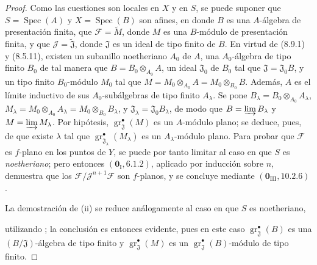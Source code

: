 \begin{proof}
Como las cuestiones son locales en $X$ y en $S$, se puede suponer que
$S=\operatorname{Spec}(A)$ y $X=\operatorname{Spec}(B)$ son afines,
en donde $B$ es una $A$-álgebra de presentación finita, que
$\mathcal F=\widetilde M$, donde $M$ es una
$B$-módulo de presentación finita, y que
$\mathcal J=\widetilde{\mathfrak J}$, donde $\mathfrak J$ es un ideal
de tipo finito de $B$. En virtud de (8.9.1) y (8.5.11),
existen un subanillo noetheriano $A_0$ de $A$, una
$A_0$-álgebra de tipo finito $B_0$ de tal manera que
$B=B_0\otimes_{A_0}A$, un ideal
$\mathfrak J_0$ de $B_0$ tal que
$\mathfrak J=\mathfrak J_0B$, y un tipo finito
$B_0$-módulo $M_0$ tal que
$M=M_0\otimes_{A_0}A=M_0\otimes_{B_0}B$. Además,
$A$ es el límite inductivo de sus
$A_0$-subálgebras de tipo finito $A_\lambda$. Se pone
$B_\lambda=B_0\otimes_{A_0}A_\lambda$,
$M_\lambda=M_0\otimes_{A_0}A_\lambda=M_0\otimes_{B_0}B_\lambda$, y
$\mathfrak J_\lambda=\mathfrak J_0B_\lambda$, de modo que
$B=\varinjlim B_\lambda$ y
$M=\varinjlim M_\lambda$. Por hipótesis,
$\operatorname{gr}_{\mathfrak J}^\bullet(M)$ es un
$A$-módulo plano; se deduce, pues, de  que
existe $\lambda$ tal que
$\operatorname{gr}_{\mathfrak J_\lambda}^\bullet(M_\lambda)$ es un
$A_\lambda$-módulo plano. Para probar que $\mathcal F$ es $f$-plano en
los puntos de $Y$, se puede por tanto limitar al caso en que
$S$ es \emph{noetheriano}; pero entonces $(\mathbf 0_{\mathrm I},6.1.2)$,
aplicado por inducción sobre $n$, demuestra que los
$\mathcal F/\mathcal J^{n+1}\mathcal F$ son $f$-planos, y se concluye mediante
$(\mathbf 0_{\mathrm{III}},10.2.6)$.


La demostración de (ii) se reduce análogamente al caso en que $S$ es noetheriano, 


utilizando ; la conclusión es entonces evidente, pues en este caso $\operatorname{gr}_{\mathfrak J}^\bullet(B)$ es una $(B/\mathfrak J)$-álgebra de tipo finito y $\operatorname{gr}_{\mathfrak J}^\bullet(M)$ es un $\operatorname{gr}_{\mathfrak J}^\bullet(B)$-módulo de tipo finito.


\end{proof}
